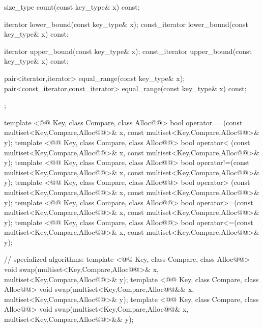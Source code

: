 \documentclass[american,twoside]{book}
\begin{document}
\begin{codeblock}
{{    size_type count(const key_type& x) const;

    iterator        lower_bound(const key_type& x);
    const_iterator  lower_bound(const key_type& x) const;

    iterator        upper_bound(const key_type& x);
    const_iterator  upper_bound(const key_type& x) const;

    pair<iterator,iterator>             equal_range(const key_type& x);
    pair<const_iterator,const_iterator> equal_range(const key_type& x) const;
  };

  template <@@ Key, class Compare, class Alloc@@>
    bool operator==(const multiset<Key,Compare,Alloc@@>& x,
                    const multiset<Key,Compare,Alloc@@>& y);
  template <@@ Key, class Compare, class Alloc@@>
    bool operator< (const multiset<Key,Compare,Alloc@@>& x,
                    const multiset<Key,Compare,Alloc@@>& y);
  template <@@ Key, class Compare, class Alloc@@>
    bool operator!=(const multiset<Key,Compare,Alloc@@>& x,
                    const multiset<Key,Compare,Alloc@@>& y);
  template <@@ Key, class Compare, class Alloc@@>
    bool operator> (const multiset<Key,Compare,Alloc@@>& x,
                    const multiset<Key,Compare,Alloc@@>& y);
  template <@@ Key, class Compare, class Alloc@@>
    bool operator>=(const multiset<Key,Compare,Alloc@@>& x,
                    const multiset<Key,Compare,Alloc@@>& y);
  template <@@ Key, class Compare, class Alloc@@>
    bool operator<=(const multiset<Key,Compare,Alloc@@>& x,
                    const multiset<Key,Compare,Alloc@@>& y);

  // specialized algorithms:
  template <@@ Key, class Compare, class Alloc@@>
    void swap(multiset<Key,Compare,Alloc@@>& x,
              multiset<Key,Compare,Alloc@@>& y);
  template <@@ Key, class Compare, class Alloc@@>
    void swap(multiset<Key,Compare,Alloc@@&& x,
              multiset<Key,Compare,Alloc@@>& y);
  template <@@ Key, class Compare, class Alloc@@>
    void swap(multiset<Key,Compare,Alloc@@& x,
              multiset<Key,Compare,Alloc@@>&& y);

}
\end{codeblock}
\end{document}
